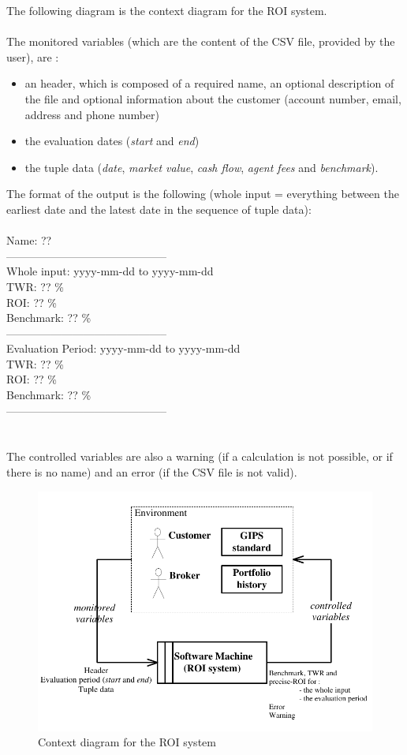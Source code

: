 \documentclass[runningheads,12pt]{article}
\begin{document}
The following diagram is the context diagram for the ROI system.\\
\\
The monitored variables (which are the content of the CSV file, provided by the user), are :
\begin{itemize}
\item an header, which is composed of a required name, an optional description of the file and optional information about the customer (account number, email, address and phone number)
\item the evaluation dates (\textit{start} and \textit{end})
\item the tuple data (\textit{date}, \textit{market value}, \textit{cash flow}, \textit{agent fees} and \textit{benchmark}).
\end{itemize}
\bigskip
The format of the output is the following (whole input = everything between the earliest date and the latest date in the sequence of tuple data):\\
\\
Name: ??\\
--------------------------------------------\\
Whole input: yyyy-mm-dd to yyyy-mm-dd\\
TWR: ?? \%\\
ROI: ?? \%\\
Benchmark: ?? \%\\
--------------------------------------------\\
Evaluation Period: yyyy-mm-dd to yyyy-mm-dd\\
TWR: ?? \%\\
ROI: ?? \%\\
Benchmark: ?? \%\\
--------------------------------------------\\
\\
\\
The controlled variables are also a warning (if a calculation is not possible, or if there is no name) and an error (if the CSV file is not valid).\\

\begin{figure}
\centering
\includegraphics[scale=1.0]{inputs/context.pdf}
\caption{Context diagram for the ROI system}
\label{fig:ROI-context}
\end{figure}
\end{document}

